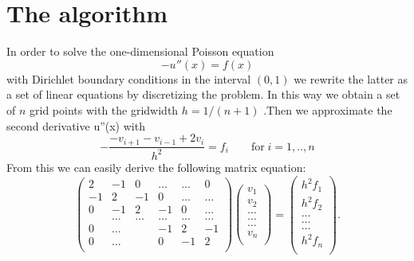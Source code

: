 \documentclass[11pt,a4wide]{article}
\begin{document}
\tableofcontents
\newpage
\section*{The algorithm}
In order to solve the one-dimensional Poisson equation
\begin{equation}
-u''(x)=f(x)
\label{eq:1}
\end{equation}
with Dirichlet boundary conditions in the interval $(0,1)$ we rewrite the latter as a set of linear equations by discretizing the problem. In this way we obtain a set of $n$ grid points with the gridwidth $h=1/(n+1)$ .Then we approximate the second derivative u''(x) with
\begin{equation}
-\dfrac{-v_{i+1}-v_{i-1}+2v_i}{h^2}=f_i\qquad \text{for}\; i=1,..,n
\label{eq:2}
\end{equation}
From this we can easily derive the following matrix equation:
\begin{equation}
     \left(\begin{array}{cccccc}
                           2& -1& 0 &\dots   & \dots &0 \\
                           -1 & 2 & -1 &0 &\dots &\dots \\
                           0&-1 &2 & -1 & 0 & \dots \\
                           & \dots   & \dots &\dots   &\dots & \dots \\
                           0&\dots   &  &-1 &2& -1 \\
                           0&\dots    &  & 0  &-1 & 2 \\
                      \end{array} \right)\left(\begin{array}{c}
                           v_1\\
                           v_2\\
                           \dots \\
                          \dots  \\
                          \dots \\
                           v_n\\
                      \end{array} \right)
  =\left(\begin{array}{c}
                           h^2f_1\\
                           h^2f_2\\
                           \dots \\
                           \dots \\
                          \dots \\
                           h^2f_n\\
                      \end{array} \right).
\end{equation}
\end{document}
